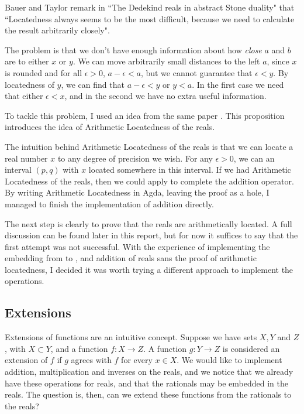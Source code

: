 \documentclass[ProjectReport]{subfiles}
\begin{document}
Bauer and Taylor remark in ``The Dedekind reals in abstract Stone duality" \cite[Remark 11.14]{bauer_taylor_2009} that ``Locatedness always seems to be the most difficult, because we need to calculate the result arbitrarily closely". 

The problem is that we don't have enough information about how \textit{close} $a$ and $b$ are to either $x$ or $y$. We can move arbitrarily small distances to the left $a$, since $x$ is rounded and for all $\epsilon > 0$, $a - \epsilon < a$, but we cannot guarantee that $\epsilon < y$. By locatedness of $y$, we can find that $a - \epsilon < y$ or $y < a$. In the first case we need that either $\epsilon < x$, and in the second we have no extra useful information. 

To tackle this problem, I used an idea from the same paper \cite[Proposition 11.15]{bauer_taylor_2009}. This proposition introduces the idea of Arithmetic Locatedness of the reals.


The intuition behind Arithmetic Locatedness of the reals is that we can locate a real number $x$ to any degree of precision we wish. For any $\epsilon > 0$, we can an interval $(p , q)$ with $x$ located somewhere in this interval. If we had Arithmetic Locatedness of the reals, then we could apply \cite[Lemma 11.16]{bauer_taylor_2009} to complete the addition operator. By writing Arithmetic Locatedness in Agda, leaving the proof as a hole, I managed to finish the implementation of addition directly.


The next step is clearly to prove that the reals are arithmetically located. A full discussion can be found later in this report, but for now it suffices to say that the first attempt was not successful. With the experience of implementing the embedding from  to , and addition of reals sans the proof of arithmetic locatedness, I decided it was worth trying a different approach to implement the operations.

\subsection{Extensions}

Extensions of functions are an intuitive concept. Suppose we have sets $X, Y$ and $Z$, with $X \subset Y$, and a function $f : X \to Z$. A function $g : Y \to Z$ is considered an extension of $f$ if $g$ agrees with $f$ for every $x \in X$. We would like to implement addition, multiplication and inverses on the reals, and we notice that we already have these operations for reals, and that the rationals may be embedded in the reals. The question is, then, can we extend these functions from the rationals to the reals?
\end{document}

